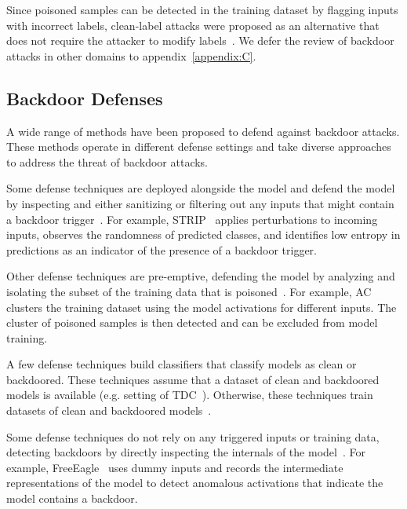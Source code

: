 \documentclass[letterpaper,twocolumn,10pt]{article}
\begin{document}
Since poisoned samples can be detected in the training dataset by flagging inputs with incorrect labels, clean-label attacks were proposed as an alternative that does not require the attacker to modify labels~\cite{barni2019cleanlabel, turner2019labelconsistent, saha2020hidden, zhao2022classoriented}. We defer the review of backdoor attacks in other domains to appendix~\ref{appendix:C}.

\subsection{Backdoor Defenses}

A wide range of methods have been proposed to defend against backdoor attacks. These methods operate in different defense settings and take diverse approaches to address the threat of backdoor attacks.

Some defense techniques are deployed alongside the model and defend the model by inspecting and either sanitizing or filtering out any inputs that might contain a backdoor trigger~\cite{guo2023scale, veldanda2021nnoculation, doan2020februus}. For example, STRIP~\cite{gao2019strip} applies perturbations to incoming inputs, observes the randomness of predicted classes, and identifies low entropy in predictions as an indicator of the presence of a backdoor trigger.

Other defense techniques are pre-emptive, defending the model by analyzing and isolating the subset of the training data that is poisoned~\cite{qi2023proactive, tran2018spectral, zhang2021topological, pan2023asset, udeshi2022model}. For example, AC~\cite{chen2018activation} clusters the training dataset using the model activations for different inputs. The cluster of poisoned samples is then detected and can be excluded from model training.

A few defense techniques build classifiers that classify models as clean or backdoored. These techniques assume that a dataset of clean and backdoored models is available (e.g. setting of TDC~\cite{neurips2022tdc}). Otherwise, these techniques train datasets of clean and backdoored models~\cite{xu2021mntd, kolouri2020litmus}.

Some defense techniques do not rely on any triggered inputs or training data, detecting backdoors by directly inspecting the internals of the model~\cite{liu2019abs, gao2019cost, wang2020datafree, zhang2021topological}. For example, FreeEagle~\cite{fu2023eagle} uses dummy inputs and records the intermediate representations of the model to detect anomalous activations that indicate the model contains a backdoor.
\end{document}
